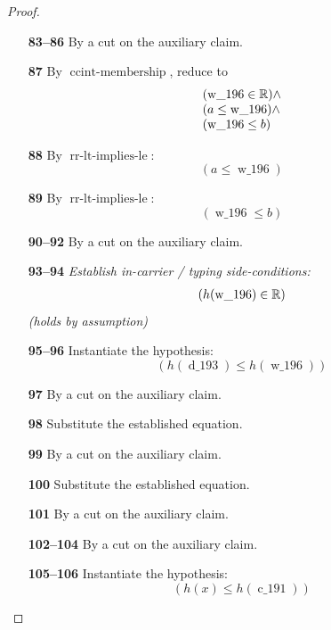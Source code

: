 \documentclass[11pt]{article}
\theoremstyle{plain}
\begin{document}
\begin{proof}
\begin{itemize}[leftmargin=2.8em, itemsep=4pt, parsep=1pt]
  \item[\textbf{83--86}] By a cut on the auxiliary claim.
  \item[\textbf{87}] By $\operatorname{ccint\text{-}membership}$, reduce to
\begin{equation*}
\begin{array}{@{}l@{}} (\operatorname{w\_196} \in \mathbb{R}) \wedge \\ (a \leq \operatorname{w\_196}) \wedge \\ (\operatorname{w\_196} \leq b) \end{array}
\end{equation*}

  \item[\textbf{88}] By $\operatorname{rr\text{-}lt\text{-}implies\text{-}le}$:
\begin{equation*}
(a \leq \operatorname{w\_196})
\end{equation*}

  \item[\textbf{89}] By $\operatorname{rr\text{-}lt\text{-}implies\text{-}le}$:
\begin{equation*}
(\operatorname{w\_196} \leq b)
\end{equation*}

  \item[\textbf{90--92}] By a cut on the auxiliary claim.
  \item[\textbf{93--94}] \emph{Establish in-carrier / typing side-conditions:}
\begin{equation*}
\begin{array}{@{}l@{}}
(h(\operatorname{w\_196}) \in \mathbb{R})
\end{array}
\end{equation*}
  \emph{(holds by assumption)}
  \item[\textbf{95--96}] Instantiate the hypothesis:
\begin{equation*}
(h(\operatorname{d\_193}) \leq h(\operatorname{w\_196}))
\end{equation*}

  \item[\textbf{97}] By a cut on the auxiliary claim.
  \item[\textbf{98}] Substitute the established equation.
  \item[\textbf{99}] By a cut on the auxiliary claim.
  \item[\textbf{100}] Substitute the established equation.
  \item[\textbf{101}] By a cut on the auxiliary claim.
  \item[\textbf{102--104}] By a cut on the auxiliary claim.
  \item[\textbf{105--106}] Instantiate the hypothesis:
\begin{equation*}
(h(x) \leq h(\operatorname{c\_191}))
\end{equation*}


\end{itemize}
\end{proof}
\end{document}
